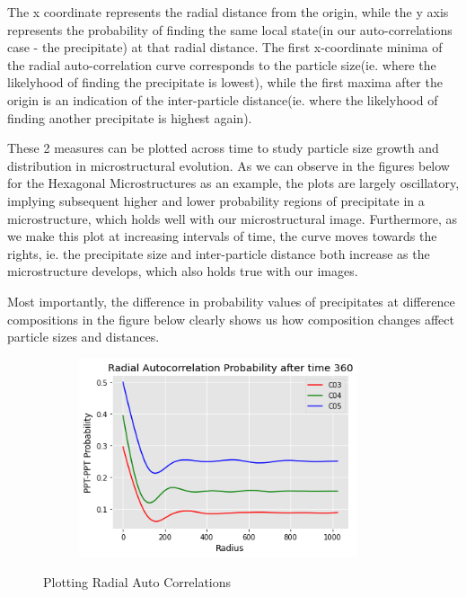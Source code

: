 \documentclass[12pt, a4paper]{report}
\begin{document}
The x coordinate represents the radial distance from the origin, while the y axis represents the probability of finding the same local state(in our auto-correlations case - the precipitate) at that radial distance. The first x-coordinate minima of the radial auto-correlation curve corresponds to the particle size(ie. where the likelyhood of finding the precipitate is lowest), while the first maxima after the origin is an indication of the inter-particle distance(ie. where the likelyhood of finding another precipitate is highest again).

These 2 measures can be plotted across time to study particle size growth and distribution in microstructural evolution. As we can observe in the figures below for the Hexagonal Microstructures as an example, the plots are largely oscillatory, implying subsequent higher and lower probability regions of precipitate in a microstructure, which holds well with our microstructural image. Furthermore, as we make this plot at increasing intervals of time, the curve moves towards the rights, ie. the precipitate size and inter-particle distance both increase as the microstructure develops, which also holds true with our images.

Most importantly, the difference in probability values of precipitates at difference compositions in the figure below clearly shows us how composition changes affect particle sizes and distances.

\begin{figure}[H]
\centering
\begin{subfigure}{.9\textwidth}
  \centering
  \includegraphics[width=0.9\textwidth]{Pictures/MSFeatures/RadialCorrExample.png}
  \label{img:microstrImg}
\end{subfigure}
\caption{Plotting Radial Auto Correlations}
\label{fig:test}
\end{figure}
\end{document}
